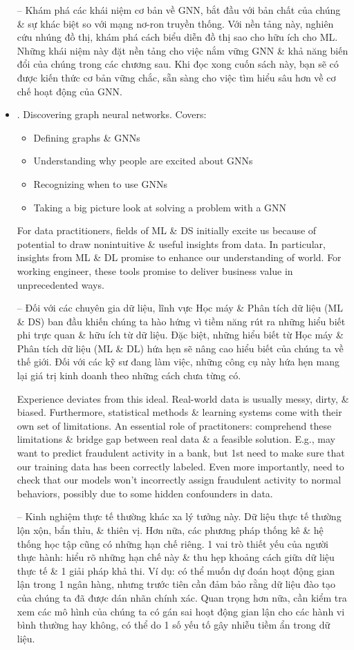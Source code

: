 \documentclass{article}
\begin{document}
\begin{itemize}
    -- Khám phá các khái niệm cơ bản về GNN, bắt đầu với bản chất của chúng \& sự khác biệt so với mạng nơ-ron truyền thống. Với nền tảng này, nghiên cứu nhúng đồ thị, khám phá cách biểu diễn đồ thị sao cho hữu ích cho ML. Những khái niệm này đặt nền tảng cho việc nắm vững GNN \& khả năng biến đổi của chúng trong các chương sau. Khi đọc xong cuốn sách này, bạn sẽ có được kiến thức cơ bản vững chắc, sẵn sàng cho việc tìm hiểu sâu hơn về cơ chế hoạt động của GNN.
    \item {. Discovering graph neural networks.} Covers:
    \begin{itemize}
        \item Defining graphs \& GNNs
        \item Understanding why people are excited about GNNs
        \item Recognizing when to use GNNs
        \item Taking a big picture look at solving a problem with a GNN
    \end{itemize}
    For data practitioners, fields of ML \& DS initially excite us because of potential to draw nonintuitive \& useful insights from data. In particular, insights from ML \& DL promise to enhance our understanding of world. For working engineer, these tools promise to deliver business value in unprecedented ways.

    -- Đối với các chuyên gia dữ liệu, lĩnh vực Học máy \& Phân tích dữ liệu (ML \& DS) ban đầu khiến chúng ta hào hứng vì tiềm năng rút ra những hiểu biết phi trực quan \& hữu ích từ dữ liệu. Đặc biệt, những hiểu biết từ Học máy \& Phân tích dữ liệu (ML \& DL) hứa hẹn sẽ nâng cao hiểu biết của chúng ta về thế giới. Đối với các kỹ sư đang làm việc, những công cụ này hứa hẹn mang lại giá trị kinh doanh theo những cách chưa từng có.

    Experience deviates from this ideal. Real-world data is usually messy, dirty, \& biased. Furthermore, statistical methods \& learning systems come with their own set of limitations. An essential role of practitoners: comprehend these limitations \& bridge gap between real data \& a feasible solution. E.g., may want to predict fraudulent activity in a bank, but 1st need to make sure that our training data has been correctly labeled. Even more importantly, need to check that our models won't incorrectly assign fraudulent activity to normal behaviors, possibly due to some hidden confounders in data.

    -- Kinh nghiệm thực tế thường khác xa lý tưởng này. Dữ liệu thực tế thường lộn xộn, bẩn thỉu, \& thiên vị. Hơn nữa, các phương pháp thống kê \& hệ thống học tập cũng có những hạn chế riêng. 1 vai trò thiết yếu của người thực hành: hiểu rõ những hạn chế này \& thu hẹp khoảng cách giữa dữ liệu thực tế \& 1 giải pháp khả thi. Ví dụ: có thể muốn dự đoán hoạt động gian lận trong 1 ngân hàng, nhưng trước tiên cần đảm bảo rằng dữ liệu đào tạo của chúng ta đã được dán nhãn chính xác. Quan trọng hơn nữa, cần kiểm tra xem các mô hình của chúng ta có gán sai hoạt động gian lận cho các hành vi bình thường hay không, có thể do 1 số yếu tố gây nhiễu tiềm ẩn trong dữ liệu.


\end{itemize}
\end{document}
